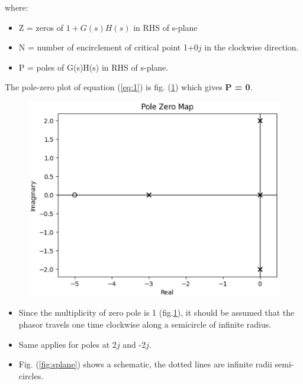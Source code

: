 \begin{enumerate}[label=\thesubsection.\arabic*.,ref=\thesubsection.\theenumi]
where:
\begin{itemize}
    \item  Z = zeros of $ {1+G(s)H(s)}$  in RHS of s-plane 
\end{itemize}
\begin{itemize}
    \item N = number of encirclement of critical point 1+0$j$ in the clockwise direction.
    \item P = poles of G(s)H(s) in RHS of s-plane.
\end{itemize}
The pole-zero plot of equation (\ref{eq:1}) is fig. (\ref{fig:pz}) which gives \textbf{P = 0}.
\begin{figure}[ht!]
        \includegraphics[width=\columnwidth]{./figs/ee18btech11025/pzG.eps}
        \caption{}
        \label{fig:pz}
\end{figure}
\begin{itemize} \label{skjvn}
    \item Since the multiplicity of zero pole is 1 (fig.\ref{fig:pz}), it should be assumed that the phasor travels one time clockwise along a semicircle of infinite radius.
    \item Same applies for poles at 2$j$ and -2$j$.
    \item Fig. (\ref{fig:splane}) shows a schematic, the dotted lines are infinite radii semi-circles.
\end{itemize}


\end{enumerate}
